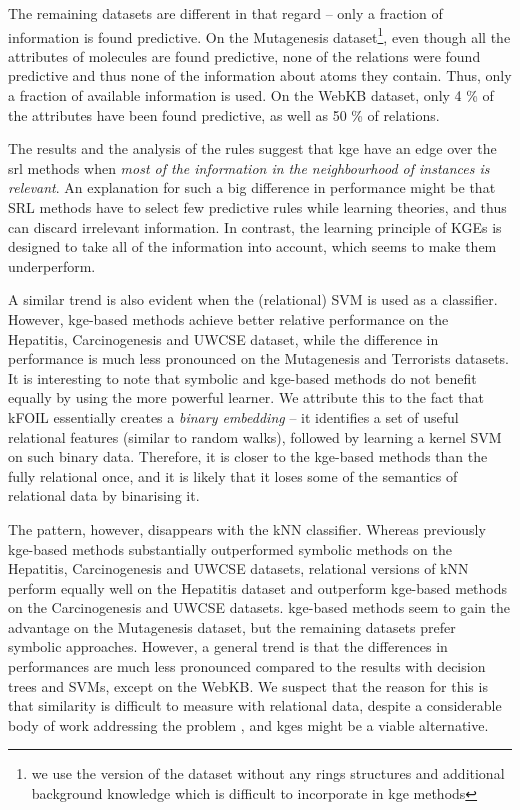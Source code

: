 The remaining datasets are different in that regard -- only a fraction of information is found predictive.
On the Mutagenesis dataset\footnote{we use the version of the dataset without any rings structures and additional background knowledge which is difficult to incorporate in \gls{kge} methods}, even though all the attributes of molecules are found predictive, none of the relations were found predictive and thus none of the information about atoms they contain.
Thus, only a fraction of available information is used.
On the WebKB dataset, only 4 \% of the attributes have been found predictive, as well as 50 \% of relations.



The results and the analysis of the rules suggest that \gls{kge} have an edge over the \gls{srl} methods when \textit{most of the information in the neighbourhood of instances is relevant}.
An explanation for such a big difference in performance might be that SRL methods have to select few predictive rules while learning theories, and thus can discard irrelevant information.
In contrast, the learning principle of KGEs is designed to take all of the information into account, which seems to make them underperform.




A similar trend is also evident when the (relational) SVM is used as a classifier.
However, \gls{kge}-based methods achieve better relative performance on the Hepatitis, Carcinogenesis and UWCSE dataset, while the difference in performance is much less pronounced on the Mutagenesis and Terrorists datasets.
It is interesting to note that symbolic and \gls{kge}-based methods do not benefit equally by using the more powerful learner.
We attribute this to the fact that kFOIL essentially creates a \textit{binary embedding} -- it identifies a set of useful relational features (similar to random walks), followed by learning a kernel SVM on such binary data.
Therefore,  it is closer to the \gls{kge}-based methods than the fully relational once, and it is likely that it loses some of the semantics of relational data by binarising it.



The pattern, however, disappears with the kNN classifier.
Whereas previously \gls{kge}-based methods substantially outperformed symbolic methods on the Hepatitis, Carcinogenesis and UWCSE datasets, relational versions of kNN perform equally well on the Hepatitis dataset and outperform \gls{kge}-based methods on the Carcinogenesis and UWCSE datasets.
\gls{kge}-based methods seem to gain the advantage on the Mutagenesis dataset, but the remaining datasets prefer symbolic approaches.
However, a general trend is that the differences in performances are much less pronounced compared to the results with decision trees and SVMs, except on the WebKB.
We suspect that the reason for this is that similarity is difficult to measure with relational data, despite a considerable body of work addressing the problem \cite{Dumancic2017a}, and \gls{kge}s might be a viable alternative.




